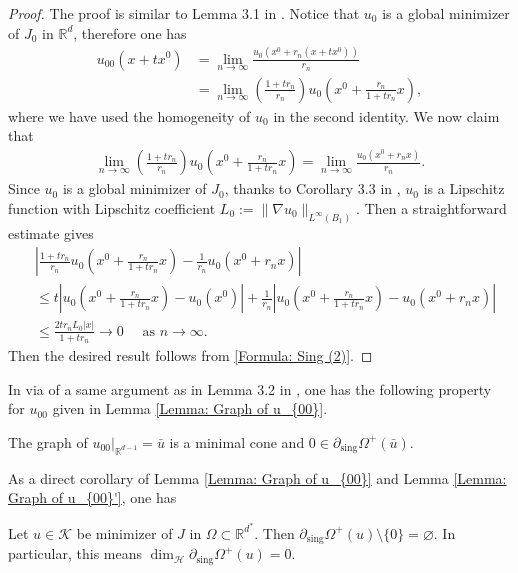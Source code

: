 \documentclass[11pt,reqno]{amsart}
\begin{document}
\begin{proof}
	The proof is similar to Lemma 3.1 in \cite{W1999}. Notice that $u_{0}$ is a global minimizer of $J_{0}$ in $\mathbb{R}^{d}$, therefore one has
	\begin{align*}
		u_{00}(x+tx^{0})&=\lim_{n\to\infty}\frac{u_{0}(x^{0}+r_{n}(x+tx^{0}))}{r_{n}}\\
		&=\lim_{n\to\infty}\left(\frac{1+tr_{n}}{r_{n}}\right)u_{0}\left(x^{0}+\frac{r_{n}}{1+tr_{n}}x\right),
	\end{align*}
	where we have used the homogeneity of $u_{0}$ in the second identity. We now claim that
	\begin{align}\label{Formula: Sing (2)}
		\lim_{n\to\infty}\left(\frac{1+tr_{n}}{r_{n}}\right)u_{0}\left(x^{0}+\frac{r_{n}}{1+tr_{n}}x\right)=\lim_{n\to\infty}\frac{u_{0}(x^{0}+r_{n}x)}{r_{n}}.
	\end{align}
	Since $u_{0}$ is a global minimizer of $J_{0}$, thanks to Corollary 3.3 in \cite{AC1981}, $u_{0}$ is a Lipschitz function with Lipschitz coefficient $L_{0}:=\|\nabla u_{0}\|_{L^{\infty}(B_{1})}$. Then a straightforward estimate gives
	\begin{align*}
		&\left|\frac{1+tr_{n}}{r_{n}}u_{0}\left(x^{0}+\frac{r_{n}}{1+tr_{n}}x\right)-\frac{1}{r_{n}}u_{0}(x^{0}+r_{n}x)\right|\\
		&\leqslant t\left|u_{0}\left(x^{0}+\frac{r_{n}}{1+tr_{n}}x\right)-u_{0}(x^{0})\right|+\frac{1}{r_{n}}\left|u_{0}\left(x^{0}+\frac{r_{n}}{1+tr_{n}}x\right)-u_{0}(x^{0}+r_{n}x)\right|\\
		&\leqslant\frac{2tr_{n}L_{0}|x|}{1+tr_{n}}\to0\quad\text{ as }n\to\infty.
	\end{align*}
	Then the desired result follows from \eqref{Formula: Sing (2)}.
\end{proof}
In via of a same argument as in Lemma 3.2 in \cite{W1999}, one has the following property for $u_{00}$ given in Lemma \ref{Lemma: Graph of u_{00}}.
\begin{lemma}\label{Lemma: Graph of u_{00}'}
	The graph of $u_{00}|_{\mathbb{R}^{d-1}}=\bar{u}$ is a minimal cone and $0\in\partial_{\mathrm{sing}}\varOmega^{+}(\bar{u})$.
\end{lemma}
As a direct corollary of Lemma \ref{Lemma: Graph of u_{00}} and Lemma \ref{Lemma: Graph of u_{00}'}, one has
\begin{proposition}\label{Proposition: d=d^{*}}
	Let $u\in\mathcal{K}$ be minimizer of $J$ in $\Omega\subset\mathbb{R}^{d^{*}}$. Then $\partial_{\mathrm{sing}}\varOmega^{+}(u)\setminus\{0\}=\varnothing$. In particular, this means $\dim_{\mathcal{H}}\partial_{\mathrm{sing}}\varOmega^{+}(u)=0$.
\end{proposition}
\end{document}
